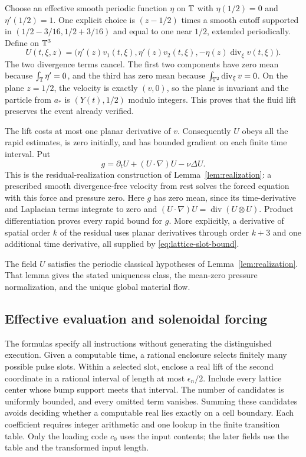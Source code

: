 Choose an effective smooth periodic function $\eta$ on $\mathbb T$ with
$\eta(1/2)=0$ and $\eta'(1/2)=1$.  One explicit choice is
$(z-1/2)$ times a smooth cutoff supported in
$(1/2-3/16,1/2+3/16)$ and equal to one near $1/2$, extended periodically.
Define on $\mathbb T^3$
\begin{equation}\label{eq:lattice-lift}
 U(t,\xi,z)=
 \bigl(\eta'(z)v_1(t,\xi),\eta'(z)v_2(t,\xi),
       -\eta(z)\operatorname{div}_\xi v(t,\xi)\bigr).
\end{equation}
The two divergence terms cancel.  The first two components have zero
mean because $\int_\mathbb T\eta'=0$, and the third has zero mean because
$\int_{\mathbb T^2}\operatorname{div}_\xi v=0$.  On the plane $z=1/2$,
the velocity is exactly $(v,0)$, so the plane is invariant and the
particle from $a_*$ is $(Y(t),1/2)$ modulo integers.  This proves that
the fluid lift preserves the event already verified.

The lift costs at most one planar derivative of $v$.  Consequently $U$
obeys all the rapid estimates, is zero initially, and has bounded
gradient on each finite time interval.  Put
\begin{equation}\label{eq:lattice-residual}
 g=\partial_tU+(U\cdot\nabla)U-\nu\Delta U.
\end{equation}
This is the residual-realization construction of
Lemma~\ref{lem:realization}: a prescribed smooth divergence-free
velocity from rest solves the forced equation with this force and
pressure zero.  Here $g$ has zero mean, since its time-derivative
and Laplacian terms integrate to zero and
$(U\cdot\nabla)U=\operatorname{div}(U\otimes U)$.
Product differentiation proves every rapid bound for $g$.  More
explicitly, a derivative of spatial order $k$ of the residual uses
planar derivatives through order $k+3$ and one additional time
derivative, all supplied by \eqref{eq:lattice-slot-bound}.

The field $U$ satisfies the periodic classical hypotheses of
Lemma~\ref{lem:realization}. That lemma gives the stated uniqueness
class, the mean-zero pressure normalization, and the unique global
material flow.

\subsection{Effective evaluation and solenoidal forcing}

The formulas specify all instructions without generating the distinguished
execution.  Given a computable time, a rational enclosure selects
finitely many possible pulse slots.  Within a selected slot, enclose
a real lift of the second coordinate in a rational interval of length
at most $\epsilon_n/2$.  Include every lattice center whose bump
support meets that interval.  The number of candidates is uniformly
bounded, and every omitted term vanishes.  Summing these candidates
avoids deciding whether a computable real lies exactly on a cell
boundary.  Each coefficient requires integer arithmetic and one lookup
in the finite transition table.  Only the loading code $c_0$ uses the
input contents; the later fields use the table and the transformed
input length.

